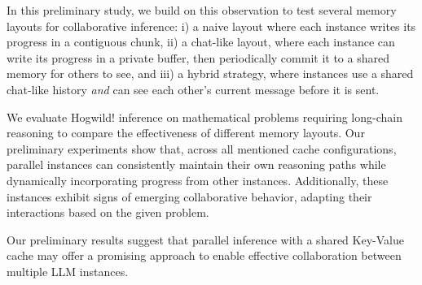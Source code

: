 In this preliminary study, we build on this observation to test several memory layouts for collaborative inference: i) a naive layout where each instance writes its progress in a contiguous chunk, ii) a chat-like layout, where each instance can write its progress in a private buffer, then periodically commit it to a shared memory for others to see, and iii) a hybrid strategy, where instances use a shared chat-like history \textit{and} can see each other's current message before it is sent. 


We evaluate Hogwild! inference on mathematical problems requiring long-chain reasoning to compare the effectiveness of different memory layouts. Our preliminary experiments show that, across all mentioned cache configurations, parallel instances can consistently maintain their own reasoning paths while dynamically incorporating progress from other instances. Additionally, these instances exhibit signs of emerging collaborative behavior, adapting their interactions based on the given problem.


Our preliminary results suggest that parallel inference with a shared Key-Value cache may offer a promising approach to enable effective collaboration between multiple LLM instances.



